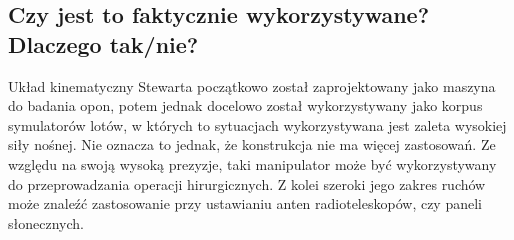 \subsection{Czy jest to faktycznie wykorzystywane? Dlaczego tak/nie?}
Układ kinematyczny Stewarta początkowo został zaprojektowany jako maszyna do badania opon, potem jednak docelowo został wykorzystywany jako korpus symulatorów lotów, w których to sytuacjach wykorzystywana jest zaleta wysokiej siły nośnej. 
Nie oznacza to jednak, że konstrukcja nie ma więcej zastosowań. 
Ze względu na swoją wysoką prezyzje, taki manipulator może być wykorzystywany do przeprowadzania operacji hirurgicznych. 
Z kolei szeroki jego zakres ruchów może znaleźć zastosowanie przy ustawianiu anten radioteleskopów, czy paneli słonecznych.







